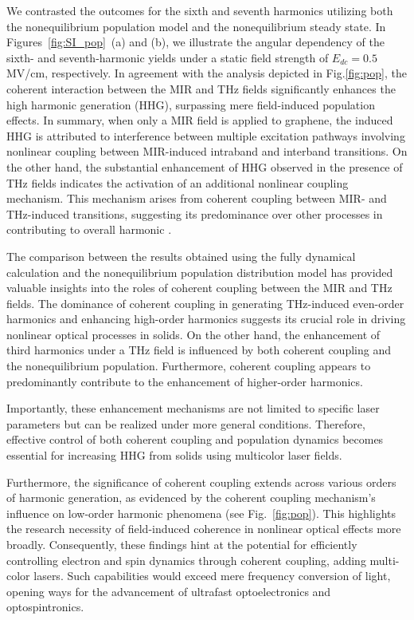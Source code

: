 We contrasted the outcomes for the sixth and seventh harmonics utilizing both the nonequilibrium population model and the nonequilibrium steady state. In Figures~\ref{fig:SI_pop}~(a) and (b), we illustrate the angular dependency of the sixth- and seventh-harmonic yields under a static field strength of $E_{dc}=0.5$MV/cm, respectively. In agreement with the analysis depicted in Fig.\ref{fig:pop}, the coherent interaction between the MIR and THz fields significantly enhances the high harmonic generation (HHG), surpassing mere field-induced population effects.
In summary, when only a MIR field is applied to graphene, the induced HHG is attributed to interference between multiple excitation pathways involving nonlinear coupling between MIR-induced intraband and interband transitions. On the other hand, the substantial enhancement of HHG observed in the presence of THz fields indicates the activation of an additional nonlinear coupling mechanism. This mechanism arises from coherent coupling between MIR- and THz-induced transitions, suggesting its predominance over other processes in contributing to overall harmonic .

The comparison between the results obtained using the fully dynamical calculation and the nonequilibrium population distribution model has provided valuable insights into the roles of coherent coupling between the MIR and THz fields. The dominance of coherent coupling in generating THz-induced even-order harmonics and enhancing high-order harmonics suggests its crucial role in driving nonlinear optical processes in solids. On the other hand, the enhancement of third harmonics under a THz field is influenced by both coherent coupling and the nonequilibrium population. Furthermore, coherent coupling appears to predominantly contribute to the enhancement of higher-order harmonics.

Importantly, these enhancement mechanisms are not limited to specific laser parameters but can be realized under more general conditions. Therefore, effective control of both coherent coupling and population dynamics becomes essential for increasing HHG from solids using multicolor laser fields.

Furthermore, the significance of coherent coupling extends across various orders of harmonic generation, as evidenced by the coherent coupling mechanism's influence on low-order harmonic phenomena (see Fig.~\ref{fig:pop}). This highlights the research necessity of field-induced coherence in nonlinear optical effects more broadly. Consequently, these findings hint at the potential for efficiently controlling electron and spin dynamics through coherent coupling, adding multi-color lasers. Such capabilities would exceed mere frequency conversion of light, opening ways for the advancement of ultrafast optoelectronics and optospintronics.
